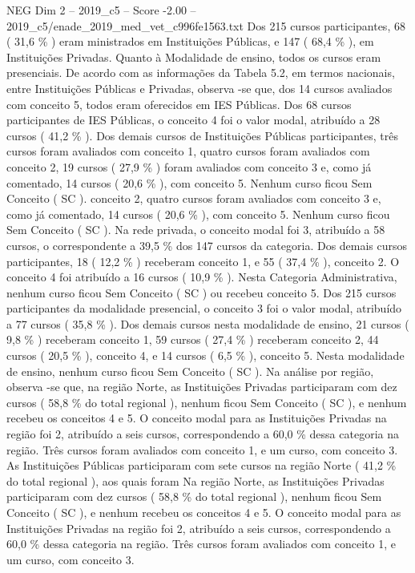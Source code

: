 \begin{textsample}{NEG Dim 2 – 2019\_c5 – Score -2.00 – 2019\_c5/enade\_2019\_med\_vet\_c996fe1563.txt}
Dos 215 cursos participantes, 68 ( 31,6 \% ) eram ministrados em Instituições Públicas, e 147 ( 68,4 \% ), em Instituições Privadas.
Quanto à Modalidade de ensino, todos os cursos eram presenciais.
De acordo com as informações da Tabela 5.2, em termos nacionais, entre Instituições Públicas e Privadas, observa -se que, dos 14 cursos avaliados com conceito 5, todos eram oferecidos em IES Públicas.
Dos 68 cursos participantes de IES Públicas, o conceito 4 foi o valor modal, atribuído a 28 cursos ( 41,2 \% ).
Dos demais cursos de Instituições Públicas participantes, três cursos foram avaliados com conceito 1, quatro cursos foram avaliados com conceito 2, 19 cursos ( 27,9 \% ) foram avaliados com conceito 3 e, como já comentado, 14 cursos ( 20,6 \% ), com conceito 5.
Nenhum curso ficou Sem Conceito ( SC ). conceito 2, quatro cursos foram avaliados com conceito 3 e, como já comentado, 14 cursos ( 20,6 \% ), com conceito 5.
Nenhum curso ficou Sem Conceito ( SC ).
Na rede privada, o conceito modal foi 3, atribuído a 58 cursos, o correspondente a 39,5 \% dos 147 cursos da categoria.
Dos demais cursos participantes, 18 ( 12,2 \% ) receberam conceito 1, e 55 ( 37,4 \% ), conceito 2.
O conceito 4 foi atribuído a 16 cursos ( 10,9 \% ).
Nesta Categoria Administrativa, nenhum curso ficou Sem Conceito ( SC ) ou recebeu conceito 5.
Dos 215 cursos participantes da modalidade presencial, o conceito 3 foi o valor modal, atribuído a 77 cursos ( 35,8 \% ).
Dos demais cursos nesta modalidade de ensino, 21 cursos ( 9,8 \% ) receberam conceito 1, 59 cursos ( 27,4 \% ) receberam conceito 2, 44 cursos ( 20,5 \% ), conceito 4, e 14 cursos ( 6,5 \% ), conceito 5.
Nesta modalidade de ensino, nenhum curso ficou Sem Conceito ( SC ).
Na análise por região, observa -se que, na região Norte, as Instituições Privadas participaram com dez cursos ( 58,8 \% do total regional ), nenhum ficou Sem Conceito ( SC ), e nenhum recebeu os conceitos 4 e 5.
O conceito modal para as Instituições Privadas na região foi 2, atribuído a seis cursos, correspondendo a 60,0 \% dessa categoria na região.
Três cursos foram avaliados com conceito 1, e um curso, com conceito 3.
As Instituições Públicas participaram com sete cursos na região Norte ( 41,2 \% do total regional ), aos quais foram Na região Norte, as Instituições Privadas participaram com dez cursos ( 58,8 \% do total regional ), nenhum ficou Sem Conceito ( SC ), e nenhum recebeu os conceitos 4 e 5.
O conceito modal para as Instituições Privadas na região foi 2, atribuído a seis cursos, correspondendo a 60,0 \% dessa categoria na região.
Três cursos foram avaliados com conceito 1, e um curso, com conceito 3.

\end{textsample}
